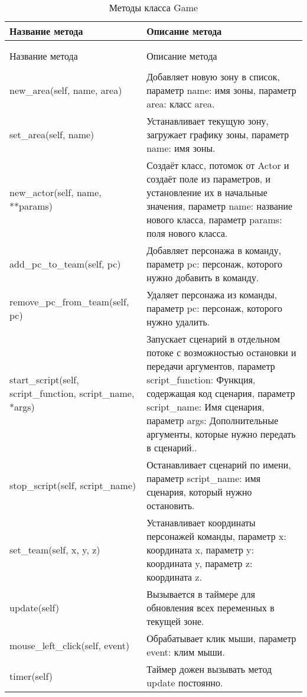 \begin{xltabular}{\textwidth}{|X|X|}
	\caption{Методы класса Game}\label{table:Game_methods} \\
	\hline \centrow
	Название метода & \centrow  Описание метода \\
	\hline {} &  \\ \hline
	\endfirsthead
	\\
	Название метода & \centrow  Описание метода \\
	\hline {} &  \\ \hline
	\finishhead
	new\_area(self, name, area) & Добавляет новую зону в список, параметр name: имя зоны, параметр area: класс area. \\
	\hline
	set\_area(self, name) & Устанавливает текущую зону, загружает графику зоны, параметр name: имя зоны. \\
	\hline
	new\_actor(self, name, **params) & Создаёт класс, потомок от Actor и создаёт поле из параметров, и установление их в начальные значения,
	параметр name: название нового класса, параметр params: поля нового класса. \\
	\hline
	add\_pc\_to\_team(self, pc) & Добавляет персонажа в команду, параметр pc: персонаж, которого нужно добавить в команду. \\
	\hline
	remove\_pc\_from\_team(self, pc) &  Удаляет персонажа из команды, параметр pc: персонаж, которого нужно удалить. \\
	\hline
	start\_script(self, script\_function, script\_name, *args) & Запускает сценарий в отдельном потоке с возможностью остановки и передачи аргументов,
	параметр script\_function: Функция, содержащая код сценария,
	параметр script\_name: Имя сценария,
	параметр args: Дополнительные аргументы, которые нужно передать в сценарий.. \\
	\hline
	stop\_script(self, script\_name) & Останавливает сценарий по имени, параметр script\_name: имя сценария, который нужно остановить. \\
	\hline
	set\_team(self, x, y, z) & Устанавливает координаты персонажей команды, параметр x: координата x, параметр y: координата y, параметр z: координата z. \\
	\hline
	update(self) & Вызывается в таймере для обновления всех переменных в текущей зоне. \\
	\hline
	mouse\_left\_click(self, event) & Обрабатывает клик мыши, параметр event: клим мыши. \\
	\hline
	timer(self) & Таймер дожен вызывать метод update постоянно. \\
	\hline
\end{xltabular}

